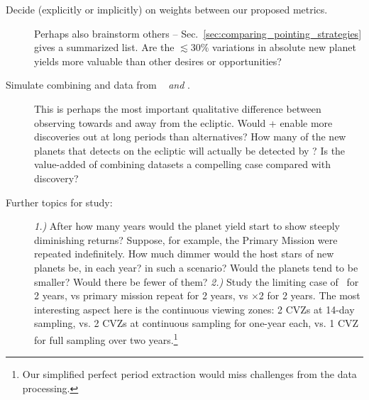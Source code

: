 \begin{description}
	\item[Decide (explicitly or implicitly) on weights between our
          proposed metrics.]  Perhaps also brainstorm others --
          Sec.~\ref{sec:comparing_pointing_strategies} gives a
          summarized list.  Are the $\lesssim30\%$ variations in
          absolute new planet yields more valuable than other desires
          or opportunities?
	
	\item[Simulate combining \tess and \ktwo data from
          \rm{\elong\ } \textit{and} \rm{\eshort}.]  This is perhaps
          the most important qualitative difference between observing
          towards and away from the ecliptic.  Would \tess\!+\ktwo
          enable more discoveries out at long periods than
          alternatives?  How many of the new planets that \tess
          detects on the ecliptic will actually be detected by \ktwo?
          Is the value-added of combining datasets a compelling case
          compared with discovery?
	
	\item[Further topics for study:]
	\textit{1.)}
	After how many years would the planet yield start to show steeply diminishing returns?
	Suppose, for example, the Primary Mission were repeated indefinitely.
        How much dimmer would the host stars of new planets be, in each year? in such a scenario?
	Would the planets tend to be smaller?
	Would there be fewer of them?
	\textit{2.)}
	Study the limiting case of \hemis\ for 2 years, vs primary mission repeat for 2 years, vs \npole$\times$2 for 2 years. The most interesting aspect here is the continuous viewing zones: 2 CVZs at 14-day sampling, vs. 2 CVZs at continuous sampling for one-year each, vs. 1 CVZ for full sampling over two years.\footnote{Our simplified perfect period extraction would miss challenges from the data processing.}
\end{description}
